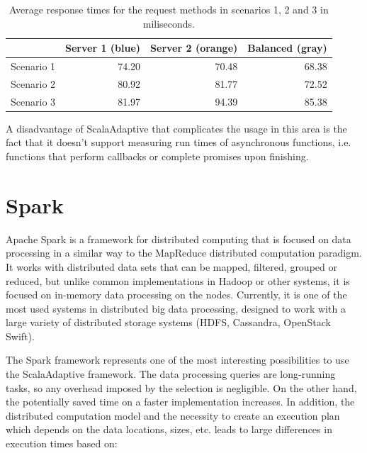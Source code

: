 \begin{table}[h!]
	\centering
	\captionsetup{justification=centering,margin=0.5cm}
		\bgroup
	\def\arraystretch{1.5}%
	
	\begin{tabular}{|l|r|r|r|}
		\hline
		& \textbf{Server 1} (blue)& \textbf{Server 2} (orange)& \textbf{Balanced} (gray)\\ \hline
		Scenario 1 & 74.20             & 70.48             & 68.38             \\ \hline
		Scenario 2 & 80.92             & 81.77             & 72.52             \\ \hline
		Scenario 3 & 81.97             & 94.39             & 85.38             \\ \hline
	\end{tabular}
	\egroup
	\caption{Average response times for the request methods in scenarios 1, 2 and 3 in miliseconds.}
\label{tab:load_balance_resp_avgs}
\end{table}

A disadvantage of ScalaAdaptive that complicates the usage in this area is the fact that it doesn't support measuring run times of asynchronous functions, i.e. functions that perform callbacks or complete promises upon finishing.

\section{Spark}

Apache Spark is a framework for distributed computing that is focused on data processing in a similar way to the MapReduce distributed computation paradigm. It works with distributed data sets that can be mapped, filtered, grouped or reduced, but unlike common implementations in Hadoop or other systems, it is focused on in-memory data processing on the nodes. Currently, it is one of the most used systems in distributed big data processing, designed to work with a large variety of distributed storage systems (HDFS, Cassandra, OpenStack Swift).

The Spark framework represents one of the most interesting possibilities to use the ScalaAdaptive framework. The data processing queries are long-running tasks, so any overhead imposed by the selection is negligible. On the other hand, the potentially saved time on a faster implementation increases. In addition, the distributed computation model and the necessity to create an execution plan which depends on the data locations, sizes, etc. leads to large differences in execution times based on:

